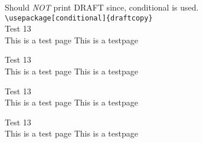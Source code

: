 \documentclass[a4paper]{article}
\newcommand{\xx}{
Test 13\\This is a test page \thepage \vfill
This is a testpage \thepage \newpage
}
\begin{document}
Should \emph{NOT} print DRAFT since, conditional is used.\\
\verb|\usepackage[conditional]{draftcopy}|\\
\xx\xx\xx\xx
\end{document}
